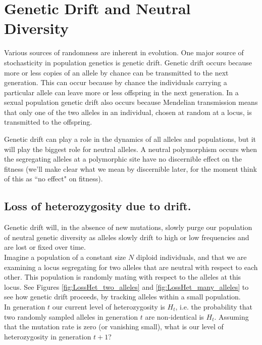 
\section{Genetic Drift and Neutral Diversity}

Various sources of randomness are inherent in evolution.  One major source of
stochasticity in population genetics is genetic drift.  Genetic drift occurs
because more or less copies of an allele by chance can be transmitted to the
next generation. This can occur because by chance the individuals carrying a
particular allele can leave more or less offspring in the next generation. In a
sexual population genetic drift also occurs because Mendelian transmission
means that only one of the two alleles in an individual, chosen at random at a
locus, is transmitted to the offspring. 

Genetic drift can play a role in the dynamics of all alleles and populations,
but it will play the biggest role for neutral alleles. A neutral polymorphism
occurs when the segregating alleles at a polymorphic site have no discernible
effect on the fitness (we'll make clear what we mean by discernible later, for
the moment think of this as ``no effect" on fitness). 


\subsection{Loss of heterozygosity due to drift.} \label{LossofHet} 

Genetic drift will, in the absence of new mutations, slowly purge our
population of neutral genetic diversity as alleles slowly drift to high or low
frequencies and are lost or fixed over time. \\

Imagine a population of a constant size $N$ diploid individuals, and that we
are examining a locus segregating for two alleles that are neutral with respect
to each other.  This population is randomly mating with respect to the alleles
at this locus. See Figures \ref{fig:LossHet_two_alleles} and
\ref{fig:LossHet_many_alleles} to see how genetic drift proceeds, by tracking
alleles within a small population. \\

In generation $t$ our current level of heterozygosity is $H_t$,
i.e. the probability that two randomly sampled alleles in generation
$t$ are non-identical is $H_t$. Assuming that the mutation rate is
zero (or vanishing small), what is our level of heterozygosity in
generation $t+1$?\\

